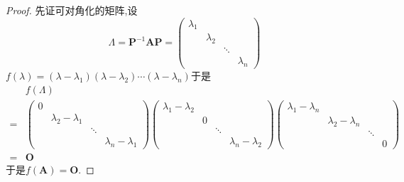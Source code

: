 \begin{proof}
    先证可对角化的矩阵,设
    \[
        \bm{\varLambda}=
        \bm{P}^{-1}\bm{AP}=\begin{pmatrix}
            \lambda_1 &           &        &           \\
                      & \lambda_2 &        &           \\
                      &           & \ddots &           \\
                      &           &        & \lambda_n
        \end{pmatrix}
    \]$f\left(\lambda\right)=
        \left(
        \lambda-\lambda_1
        \right)\left(
        \lambda-\lambda_2
        \right)\cdots\left(
        \lambda-\lambda_n
        \right)$于是
    \begin{align*}
          & f\left(\bm{\varLambda}\right)                      \\
        = &
        \begin{pmatrix}
            0 &                     &        &                     \\
              & \lambda_2-\lambda_1 &        &                     \\
              &                     & \ddots &                     \\
              &                     &        & \lambda_n-\lambda_1
        \end{pmatrix}\begin{pmatrix}
                         \lambda_1-\lambda_2 &   &        &                     \\
                                             & 0 &        &                     \\
                                             &   & \ddots &                     \\
                                             &   &        & \lambda_n-\lambda_2
                     \end{pmatrix}
        \begin{pmatrix}
            \lambda_1-\lambda_n &                     &        &   \\
                                & \lambda_2-\lambda_n &        &   \\
                                &                     & \ddots &   \\
                                &                     &        & 0
        \end{pmatrix} \\
        = & \bm{O}
    \end{align*}于是$f\left(\bm{A}\right)=\bm{O}.$


\end{proof}
